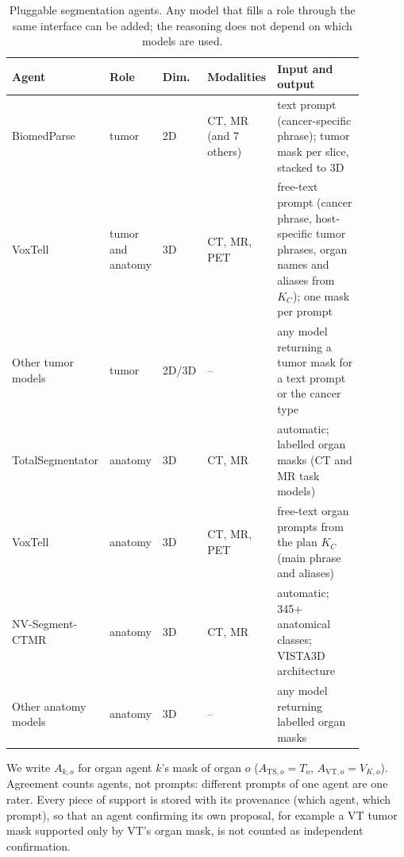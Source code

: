\documentclass[fleqn,10pt]{olplainarticle}
\begin{document}
\begin{table}[t]
\centering\small
\caption{Pluggable segmentation agents. Any model that fills a role through the same interface can be added; the
reasoning does not depend on which models are used.}
\label{tab:agents}
\begin{tabular}{p{0.17\linewidth}p{0.13\linewidth}p{0.1\linewidth}p{0.12\linewidth}p{0.36\linewidth}}
\hline
Agent & Role & Dim. & Modalities & Input and output\\
\hline
BiomedParse \cite{zhao2025biomedparse} & tumor & 2D & CT, MR (and 7 others) & text prompt (cancer-specific phrase); tumor mask per slice, stacked to 3D\\
VoxTell \cite{rokuss2025voxtell} & tumor and anatomy & 3D & CT, MR, PET & free-text prompt (cancer phrase, host-specific tumor phrases, organ names and aliases from $K_C$); one mask per prompt\\
Other tumor models & tumor & 2D/3D & -- & any model returning a tumor mask for a text prompt or the cancer type\\
\hline
TotalSegmentator \cite{wasserthal2023totalsegmentator,dantonoli2025totalsegmentatormri} & anatomy & 3D & CT, MR & automatic; labelled organ masks (CT and MR task models)\\
VoxTell \cite{rokuss2025voxtell} & anatomy & 3D & CT, MR, PET & free-text organ prompts from the plan $K_C$ (main phrase and aliases)\\
NV-Segment-CTMR \cite{nvsegmentctmr,he2025vista3d} & anatomy & 3D & CT, MR & automatic; 345+ anatomical classes; VISTA3D architecture\\
Other anatomy models & anatomy & 3D & -- & any model returning labelled organ masks\\
\hline
\end{tabular}
\end{table} We write $A_{k,o}$ for organ agent $k$'s mask of
organ $o$ ($A_{\mathrm{TS},o}=T_o$, $A_{\mathrm{VT},o}=V_{K,o}$). Agreement counts agents, not prompts: different
prompts of one agent are one rater. Every piece of support is stored with its provenance (which agent, which prompt), so
that an agent confirming its own proposal, for example a VT tumor mask supported only by VT's organ mask, is not counted
as independent confirmation.
\end{document}
